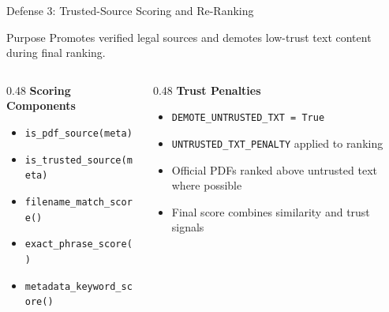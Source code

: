 \documentclass[aspectratio=169]{beamer}
\begin{document}
\begin{frame}{Defense 3: Trusted-Source Scoring and Re-Ranking}
    \small
    \begin{block}{Purpose}
        Promotes verified legal sources and demotes low-trust text content during final ranking.
    \end{block}
    \vspace{0.15cm}
    \begin{columns}[t]
        \begin{column}{0.48\textwidth}
            \textbf{Scoring Components}
            \begin{itemize}
                \item \texttt{is\_pdf\_source(meta)}
                \item \texttt{is\_trusted\_source(meta)}
                \item \texttt{filename\_match\_score()}
                \item \texttt{exact\_phrase\_score()}
                \item \texttt{metadata\_keyword\_score()}
            \end{itemize}
        \end{column}
        \begin{column}{0.48\textwidth}
            \textbf{Trust Penalties}
            \begin{itemize}
                \item \texttt{DEMOTE\_UNTRUSTED\_TXT = True}
                \item \texttt{UNTRUSTED\_TXT\_PENALTY} applied to ranking
                \item Official PDFs ranked above untrusted text where possible
                \item Final score combines similarity and trust signals
            \end{itemize}
        \end{column}
    \end{columns}
\end{frame}
\end{document}
